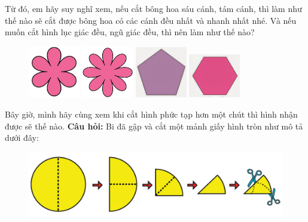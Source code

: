 Từ đó, em hãy suy nghĩ xem, nếu cắt bông hoa sáu cánh, tám cánh, thì làm như thế nào sẽ cắt được bông hoa có các cánh đều nhất và nhanh nhất nhé. Và nếu muốn cắt hình lục giác đều, ngũ giác đều, thì nên làm như thế nào? 
\begin{figure}[H]
	\centering
	\captionsetup{labelformat=empty}
	\captionsetup{justification=centering}
	\includegraphics[width =0.2\textwidth]{cat-16a}
	\hfill
	\includegraphics[width =0.2\textwidth]{cat-16b}
	\hfill
	\includegraphics[width =0.2\textwidth]{cat-16c}
	\hfill
	\includegraphics[width =0.2\textwidth]{cat-16d}	
	\vspace*{-5pt}
\end{figure}
Bây giờ, mình hãy cùng xem khi cắt hình phức tạp hơn một chút thì hình nhận được sẽ thế nào.
\vskip0.3cm
\textbf{Câu hỏi:} Bi đã gập và cắt một mảnh giấy hình tròn như mô tả dưới đây:
\begin{figure}[H]
	\vspace*{-5pt}	
	\captionsetup{labelformat=empty}
	\centering
	\captionsetup{justification=raggedleft}
	\includegraphics[width =1\textwidth]{cat-17}
	\vspace*{-10pt}
\end{figure}
